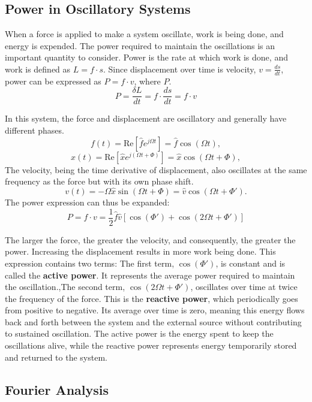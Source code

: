 \documentclass[a4paper]{article}
\begin{document}
\subsection{Power in Oscillatory Systems}

When a force is applied to make a system oscillate, work is being done, and energy is expended. The power required to maintain the oscillations is an important quantity to consider. Power is the rate at which work is done, and work is defined as \( L = f \cdot s \). Since displacement over time is velocity, \( v = \frac{ds}{dt} \), power can be expressed as \( P = f \cdot v \), where \( P \).
\[
P = \frac{\delta L}{dt} = f \cdot \frac{ds}{dt} = f \cdot v
\]


In this system, the force and displacement are oscillatory and generally have different phases.
\[
f(t) = \text{Re}\left[\hat{f} e^{j\Omega t}\right] = \hat{f} \cos(\Omega t),
\]
\[
x(t) = \text{Re}\left[\hat{x} e^{j(\Omega t + \Phi)}\right] = \hat{x} \cos(\Omega t + \Phi),
\]
The velocity, being the time derivative of displacement, also oscillates at the same frequency as the force but with its own phase shift.
\[
v(t) = -\Omega \hat{x} \sin(\Omega t + \Phi) = \hat{v} \cos(\Omega t + \Phi').
\]The power expression can thus be expanded:
\[
P = f \cdot v = \frac{1}{2} \hat{f} \hat{v} \left[\cos(\Phi') + \cos(2\Omega t + \Phi')\right]
\]

The larger the force, the greater the velocity, and consequently, the greater the power. Increasing the displacement results in more work being done.
This expression contains two terms: The first term, \( \cos(\Phi') \), is constant and is called the \textbf{active power}. It represents the average power required to maintain the oscillation.,The second term, \( \cos(2\Omega t + \Phi') \), oscillates over time at twice the frequency of the force. This is the \textbf{reactive power}, which periodically goes from positive to negative. Its average over time is zero, meaning this energy flows back and forth between the system and the external source without contributing to sustained oscillation. 
The active power is the energy spent to keep the oscillations alive, while the reactive power represents energy temporarily stored and returned to the system.


\subsection{Fourier Analysis}
\end{document}
